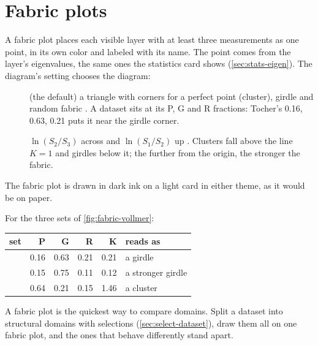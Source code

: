 \section{Fabric plots}\label{sec:fabric}


A fabric plot places each visible layer with at least three measurements as one point, in its own color
and labeled with its name. The point comes from the layer's eigenvalues, the same ones the statistics card
shows (\cref{sec:stats-eigen}). The diagram's  setting chooses the diagram:

\begin{description}
\item[] (the default) a triangle with corners for a perfect point (cluster), girdle and
random fabric \parencite{vollmer1990}. A dataset sits at its P, G and R fractions: Tocher's 0.16, 0.63,
0.21 puts it near the girdle corner.
\item[] $\ln(S_2/S_3)$ across and $\ln(S_1/S_2)$ up \parencite{woodcock1977}. Clusters
fall above the line $K = 1$ and girdles below it; the further from the origin, the stronger the fabric.
\end{description}

The fabric plot is drawn in dark ink on a light card in either theme, as it would be on paper.

For the three sets of \cref{fig:fabric-vollmer}:

\begin{center}\small
\begin{tabularx}{\linewidth}{@{}lrrrrL@{}}\toprule
\sffamily\bfseries set & \sffamily\bfseries P & \sffamily\bfseries G & \sffamily\bfseries R & \sffamily\bfseries K & \sffamily\bfseries reads as \\\midrule
{} & 0.16 & 0.63 & 0.21 & 0.21 & a girdle \\
 & 0.15 & 0.75 & 0.11 & 0.12 & a stronger girdle \\
 & 0.64 & 0.21 & 0.15 & 1.46 & a cluster \\
\bottomrule\end{tabularx}
\end{center}

\begin{tip}
A fabric plot is the quickest way to compare domains. Split a dataset into structural domains with
selections (\cref{sec:select-dataset}), draw them all on one fabric plot, and the ones that behave
differently stand apart.
\end{tip}

